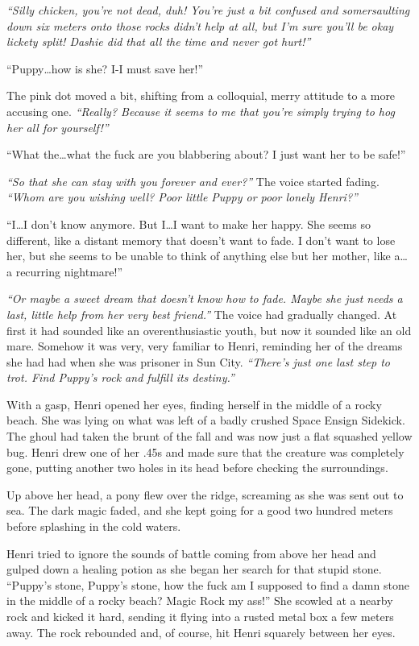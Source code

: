 \emph{``Silly chicken, you're not dead, \emph{duh}\/! You're just a bit confused and somersaulting down six meters onto those rocks didn't help at all, but I'm sure you'll be okay lickety split! Dashie did that all the time and never got hurt!''}

``Puppy\dots how is she? I-I must save her!''

The pink dot moved a bit, shifting from a colloquial, merry attitude to a more accusing one. \emph{``Really? Because it seems to me that you're simply trying to hog her all for yourself!''}

``What the\dots what the fuck are you blabbering about? I just want her to be safe!''

\emph{``So that she can stay with you forever and ever?''}\/ The voice started fading. \emph{``Whom are you wishing well? Poor little Puppy or poor lonely Henri?''}

``I\dots I don't know anymore. But I\dots I want to make her happy. She seems so different, like a distant memory that doesn't want to fade. I don't want to lose her, but she seems to be unable to think of anything else but her mother, like a\dots a recurring nightmare!''

\emph{``Or maybe a sweet dream that doesn't know how to fade. Maybe she just needs a last, little help from her very best friend.''}\/ The voice had gradually changed. At first it had sounded like an overenthusiastic youth, but now it sounded like an old mare. Somehow it was very, very familiar to Henri, reminding her of the dreams she had had when she was prisoner in Sun City. \emph{``There's just one last step to trot. Find Puppy's rock and fulfill its destiny.''}

With a gasp, Henri opened her eyes, finding herself in the middle of a rocky beach. She was lying on what was left of a badly crushed Space Ensign Sidekick. The ghoul had taken the brunt of the fall and was now just a flat squashed yellow bug. Henri drew one of her .45s and made sure that the creature was completely gone, putting another two holes in its head before checking the surroundings.

Up above her head, a pony flew over the ridge, screaming as she was sent out to sea. The dark magic faded, and she kept going for a good two hundred meters before splashing in the cold waters.

Henri tried to ignore the sounds of battle coming from above her head and gulped down a healing potion as she began her search for that stupid stone. ``Puppy's stone, Puppy's stone, how the fuck am I supposed to find a damn stone in the middle of a rocky beach? Magic Rock my ass!'' She scowled at a nearby rock and kicked it hard, sending it flying into a rusted metal box a few meters away. The rock rebounded and, of course, hit Henri squarely between her eyes.

